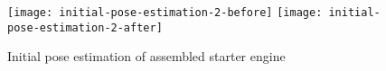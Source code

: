 
\begin{figure}[!ht]
	\centering
	\texttt{[image: initial-pose-estimation-2-before]}
	\hspace{0.5em}
	\texttt{[image: initial-pose-estimation-2-after]}
	\caption{Initial pose estimation of assembled starter engine}
\end{figure}
